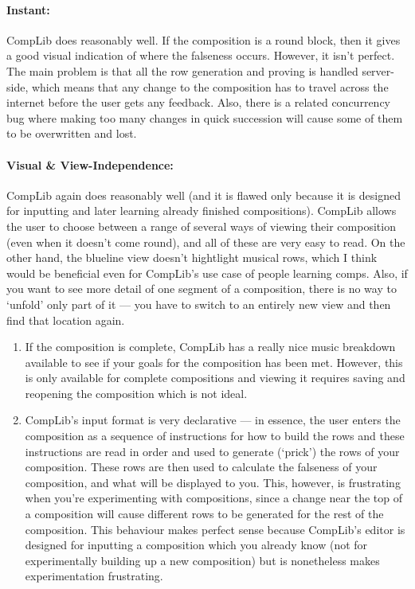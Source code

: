 \documentclass[12pt]{article}
\begin{document}
\paragraph{Instant:}  CompLib does reasonably well.  If the composition is a round block, then it
gives a good visual indication of where the falseness occurs.  However, it isn't perfect.  The main
problem is that all the row generation and proving is handled server-side, which means that any
change to the composition has to travel across the internet before the user gets any feedback.
Also, there is a related concurrency bug where making too many changes in quick succession will
cause some of them to be overwritten and lost.

\paragraph{Visual \& View-Independence:}  CompLib again does reasonably well (and it is flawed only
because it is designed for inputting and later learning already finished compositions).
CompLib allows the user to choose between a range of several ways of viewing their composition (even
when it doesn't come round), and all of these are very easy to read.  On the other hand, the
blueline view doesn't hightlight musical rows, which I think would be beneficial even for CompLib's
use case of people learning comps.  Also, if you want to see more detail of one segment of a
composition, there is no way to `unfold' only part of it --- you have to switch to an entirely new
view and then find that location again.

\begin{enumerate}
    \item If the composition is complete, CompLib has a really nice music breakdown available to see
        if your goals for the composition has been met.  However, this is only available for
        complete compositions and viewing it requires saving and reopening the composition which is
        not ideal.
    \item CompLib's input format is very declarative --- in essence, the user enters the composition
        as a sequence of instructions for how to build the rows and these instructions are read
        in order and used to generate (`prick') the rows of your composition.  These rows are then
        used to calculate the falseness of your composition, and what will be displayed to you.
        This, however, is frustrating when you're experimenting with compositions, since a change
        near the top of a composition will cause different rows to be generated for the rest of the
        composition.  This behaviour makes perfect sense because CompLib's editor is designed for
        inputting a composition which you already know (not for experimentally building up a new
        composition) but is nonetheless makes experimentation frustrating.
\end{enumerate}
\end{document}
